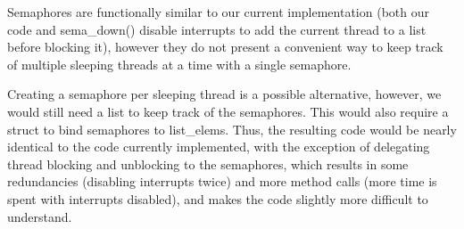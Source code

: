 \documentclass[11pt]{article}
\begin{document}
Semaphores are functionally similar to our current implementation (both our code and sema\_down() disable interrupts to add the current thread to a list before blocking it), however they do not present a convenient way to keep track of multiple sleeping threads at a time with a single semaphore.

Creating a semaphore per sleeping thread is a possible alternative, however, we would still need a list to keep track of the semaphores. This would also require a struct to bind semaphores to list\_elems. Thus, the resulting code would be nearly identical to the code currently implemented, with the exception of delegating thread blocking and unblocking to the semaphores, which results in some redundancies (disabling interrupts twice) and more method calls (more time is spent with interrupts disabled), and makes the code slightly more difficult to understand.
\end{document}
